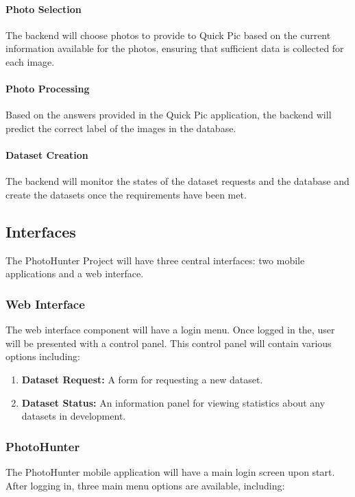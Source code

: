 \documentclass{article}
\begin{document}
  \paragraph{Photo Selection}
  The backend will choose photos to provide to Quick Pic based on the current
  information available for the photos, ensuring that sufficient data is collected
  for each image.

  \paragraph{Photo Processing}
  Based on the answers provided in the Quick Pic application, the backend will
  predict the correct label of the images in the database.

  \paragraph{Dataset Creation}
  The backend will monitor the states of the dataset requests and the database
  and create the datasets once the requirements have been met.

\subsection{Interfaces}
The PhotoHunter Project will have three central interfaces: two mobile
applications and a web interface.

\subsubsection{Web Interface}
The web interface component will have a login menu. Once logged in the, user
will be presented with a control panel. This control panel will contain various
options including:

\begin{enumerate}

  \item \textbf{Dataset Request:} A form for requesting a new dataset.

  \item \textbf{Dataset Status:} An information panel for viewing statistics
        about any datasets in development.

\end{enumerate}

\subsubsection{PhotoHunter}
The PhotoHunter mobile application will have a main login screen upon start.
After logging in, three main menu options are available, including:
\end{document}
